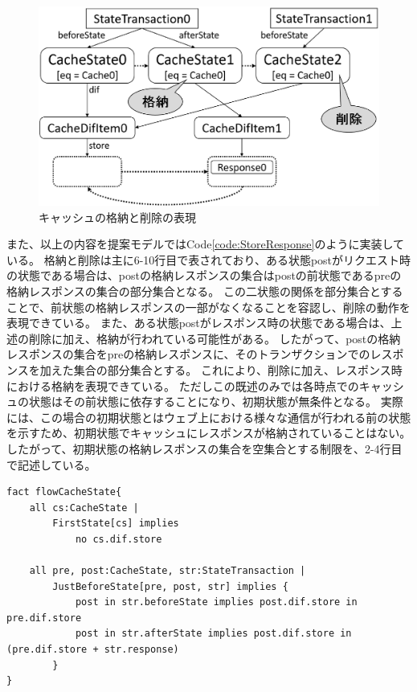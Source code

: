 \documentclass[12pt,a4paper]{jbook}
\begin{document}
\begin{figure}[htb]
\centering
\includegraphics[width=450pt]{./fig/ProposedModel-ResponseStoreDelete.eps}
\caption{キャッシュの格納と削除の表現}
\label{fig:ProposedModel-ResponseStoreDelete}
\end{figure}

また、以上の内容を提案モデルではCode\ref{code:StoreResponse}のように実装している。
格納と削除は主に6-10行目で表されており、ある状態postがリクエスト時の状態である場合は、postの格納レスポンスの集合はpostの前状態であるpreの格納レスポンスの集合の部分集合となる。
この二状態の関係を部分集合とすることで、前状態の格納レスポンスの一部がなくなることを容認し、削除の動作を表現できている。
また、ある状態postがレスポンス時の状態である場合は、上述の削除に加え、格納が行われている可能性がある。
したがって、postの格納レスポンスの集合をpreの格納レスポンスに、そのトランザクションでのレスポンスを加えた集合の部分集合とする。
これにより、削除に加え、レスポンス時における格納を表現できている。
ただしこの既述のみでは各時点でのキャッシュの状態はその前状態に依存することになり、初期状態が無条件となる。
実際には、この場合の初期状態とはウェブ上における様々な通信が行われる前の状態を示すため、初期状態でキャッシュにレスポンスが格納されていることはない。
したがって、初期状態の格納レスポンスの集合を空集合とする制限を、2-4行目で記述している。

\begin{lstlisting}[caption=レスポンスの格納と削除の表現, label=code:StoreResponse]
fact flowCacheState{
	all cs:CacheState |
		FirstState[cs] implies
			no cs.dif.store

	all pre, post:CacheState, str:StateTransaction |
		JustBeforeState[pre, post, str] implies {
			post in str.beforeState implies post.dif.store in pre.dif.store
			post in str.afterState implies post.dif.store in (pre.dif.store + str.response)
		}
}
\end{lstlisting}
\end{document}
